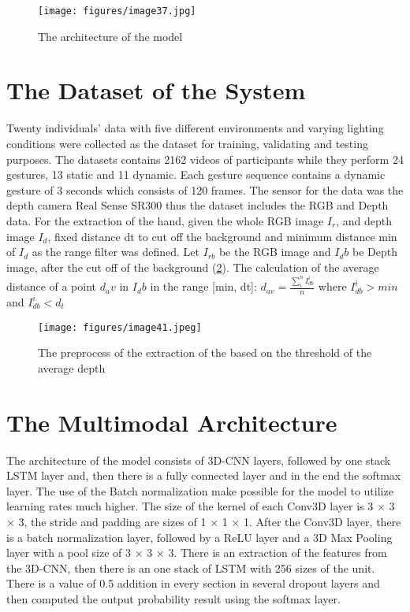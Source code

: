 \documentclass[12pt]{book}
\begin{document}
\begin{figure}[!htbp]
\centering
  \texttt{[image: figures/image37.jpg]}
  \\
  \caption{The architecture of the model \cite{NOO2019}}
  \label{fig:fig22}
\end{figure}

\section{The Dataset of the System}
Twenty individuals’ data with five different environments and varying lighting conditions were collected as the dataset for training, validating and testing purposes. The datasets contains 2162 videos of participants while they perform 24 gestures, 13 static and 11 dynamic. Each gesture sequence contains a dynamic gesture of 3 seconds which consists of 120 frames. The sensor for the data was the depth camera Real Sense SR300 thus the dataset includes the RGB and Depth data. For the extraction of the hand, given the whole RGB image $I_r$, and depth image $I_d$, fixed distance dt to cut off the background and minimum distance min of $I_d$ as the range filter was defined. Let $I_{rb}$ be the RGB image and $I_db$ be Depth image, after the cut off of the background (\ref{fig:fig23}). The calculation of the average distance of a point $d_av$ in $I_db$ in the range [min, dt]:  $d_{av}=\frac {\sum_i^n I_{db}^i}{n}$ where $I_{db}^i>min$ and $I_{db}^i<d_t$

\begin{figure}[!htbp]
\centering
  \texttt{[image: figures/image41.jpeg]}
  \\
  \caption{The preprocess of the extraction of the based on the threshold  of the average depth \cite{NOO2019}}
  \label{fig:fig23}
\end{figure}

\section{The Multimodal Architecture}
The architecture of the model consists of 3D-CNN layers, followed by one stack LSTM layer and, then there is a fully connected layer and in the end the softmax layer. The use of the Batch normalization make possible for the model to utilize learning rates much higher. The size of the kernel of each Conv3D layer is 3 × 3 × 3, the stride and padding are sizes of 1 × 1 × 1. After the Conv3D layer, there is a batch normalization layer, followed by a ReLU layer and a 3D Max Pooling layer with a pool size of 3 × 3 × 3. There is an extraction of the features from the 3D-CNN, then there is an one stack of LSTM with 256 sizes of the unit. There is a value of 0.5 addition in every section in several dropout layers and then computed the output probability result using the softmax layer.
\end{document}
